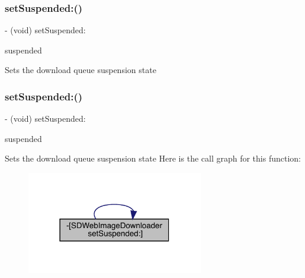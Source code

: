 \subsubsection{\texorpdfstring{set\+Suspended\+:()}{setSuspended:()}\hspace{0.1cm}{\footnotesize\ttfamily [1/3]}}
{\footnotesize\ttfamily -\/ (void) set\+Suspended\+: \begin{DoxyParamCaption}\item[{(B\+O\+OL)}]{suspended }\end{DoxyParamCaption}}

Sets the download queue suspension state \mbox{\label{interface_s_d_web_image_downloader_aa477f2fb00e135fbaa7cef40111feb06}} 
\subsubsection{\texorpdfstring{set\+Suspended\+:()}{setSuspended:()}\hspace{0.1cm}{\footnotesize\ttfamily [2/3]}}
{\footnotesize\ttfamily -\/ (void) set\+Suspended\+: \begin{DoxyParamCaption}\item[{(B\+O\+OL)}]{suspended }\end{DoxyParamCaption}}

Sets the download queue suspension state Here is the call graph for this function\+:\nopagebreak
\begin{figure}[H]
\begin{center}
\leavevmode
\includegraphics[width=218pt]{interface_s_d_web_image_downloader_aa477f2fb00e135fbaa7cef40111feb06_cgraph}
\end{center}
\end{figure}
\mbox{\label{interface_s_d_web_image_downloader_aa477f2fb00e135fbaa7cef40111feb06}} 
